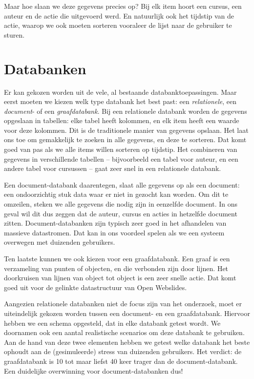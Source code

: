 \documentclass[twoside,twocolumn]{article}
\begin{document}
Maar hoe slaan we deze gegevens precies op?
Bij elk item hoort een cursus, een auteur en de actie die uitgevoerd werd.
En natuurlijk ook het tijdstip van de actie, waarop we ook moeten sorteren vooraleer de lijst naar de gebruiker te sturen.

\section*{Databanken}

Er kan gekozen worden uit de vele, al bestaande databanktoepassingen.
Maar eerst moeten we kiezen welk type databank het best past: een \textit{relationele}, een \textit{document}- of een \textit{graafdatabank}.
Bij een relationele databank worden de gegevens opgeslaan in tabellen: elke tabel heeft kolommen, en elk item heeft een waarde voor deze kolommen.
Dit is de traditionele manier van gegevens opslaan.
Het laat ons toe om gemakkelijk te zoeken in alle gegevens, en deze te sorteren.
Dat komt goed van pas als we alle items willen sorteren op tijdstip.
Het combineren van gegevens in verschillende tabellen -- bijvoorbeeld een tabel voor auteur, en een andere tabel voor cursussen -- gaat zeer snel in een relationele databank.

Een document-databank daarentegen, slaat alle gegevens op als een document: een ondoorzichtig stuk data waar er niet in gezocht kan worden.
Om dit te omzeilen, steken we alle gegevens die nodig zijn in eenzelfde document.
In ons geval wil dit dus zeggen dat de auteur, cursus en acties in hetzelfde document zitten.
Document-databanken zijn typisch zeer goed in het afhandelen van massieve datastromen. 
Dat kan in ons voordeel spelen als we een systeem overwegen met duizenden gebruikers.

Ten laatste kunnen we ook kiezen voor een graafdatabank.
Een graaf is een verzameling van punten of objecten, en die verbonden zijn door lijnen.
Het doorkruisen van lijnen van object tot object is een zeer snelle actie.
Dat komt goed uit voor de gelinkte datastructuur van Open Webslides.


Aangezien relationele databanken niet de focus zijn van het onderzoek, moet er uiteindelijk gekozen worden tussen een document- en een graafdatabank.
Hiervoor hebben we een schema opgesteld, dat in elke databank getest wordt.
We doornamen ook een aantal realistische scenarios om deze databank te gebruiken.
Aan de hand van deze twee elementen hebben we getest welke databank het beste ophoudt aan de (gesimuleerde) stress van duizenden gebruikers.
Het verdict: de graafdatabank is 10 tot maar liefst 40 keer trager dan de document-databank.
Een duidelijke overwinning voor document-databanken dus!
\end{document}
